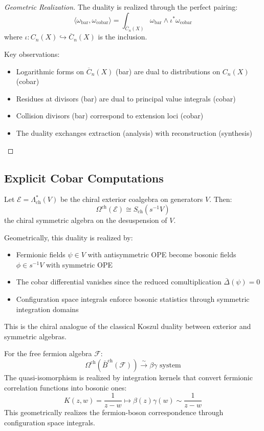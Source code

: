 \begin{proof}[Geometric Realization]
The duality is realized through the perfect pairing:
\[
\langle \omega_{\text{bar}}, \omega_{\text{cobar}} \rangle = \int_{\overline{C}_n(X)} \omega_{\text{bar}} \wedge \iota^*\omega_{\text{cobar}}
\]
where $\iota: C_n(X) \hookrightarrow \overline{C}_n(X)$ is the inclusion.

Key observations:
\begin{itemize}
\item Logarithmic forms on $\overline{C}_n(X)$ (bar) are dual to distributions on $C_n(X)$ (cobar)
\item Residues at divisors (bar) are dual to principal value integrals (cobar)
\item Collision divisors (bar) correspond to extension loci (cobar)
\item The duality exchanges extraction (analysis) with reconstruction (synthesis)
\end{itemize}
\end{proof}

\subsection{Explicit Cobar Computations}

\begin{example}\label{ex:cobar-exterior}
Let $\mathcal{E} = \Lambda^*_{\text{ch}}(V)$ be the chiral exterior coalgebra on generators $V$. Then:
\[
\Omega^{\text{ch}}(\mathcal{E}) \cong S_{\text{ch}}(s^{-1}V)
\]
the chiral symmetric algebra on the desuspension of $V$. 

Geometrically, this duality is realized by:
\begin{itemize}
\item Fermionic fields $\psi \in V$ with antisymmetric OPE become bosonic fields $\phi \in s^{-1}V$ with symmetric OPE
\item The cobar differential vanishes since the reduced comultiplication $\bar{\Delta}(\psi) = 0$
\item Configuration space integrals enforce bosonic statistics through symmetric integration domains
\end{itemize}

This is the chiral analogue of the classical Koszul duality between exterior and symmetric algebras.
\end{example}

\begin{example}\label{ex:cobar-bar-fermion}
For the free fermion algebra $\mathcal{F}$:
\[
\Omega^{\text{ch}}(\bar{B}^{\text{ch}}(\mathcal{F})) \xrightarrow{\sim} \beta\gamma \text{ system}
\]
The quasi-isomorphism is realized by integration kernels that convert fermionic correlation functions into bosonic ones:
\[
K(z,w) = \frac{1}{z-w} \mapsto \beta(z)\gamma(w) \sim \frac{1}{z-w}
\]
This geometrically realizes the fermion-boson correspondence through configuration space integrals.
\end{example}



